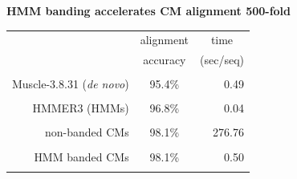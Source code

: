\documentclass[landscape]{slides}
\begin{document}
\begin{slide}
\begin{center}

\textbf{HMM banding accelerates CM alignment 500-fold}
\end{center}
\medskip
\medskip
\begin{center}

\begin{tabular}{rcr} 
& \multicolumn{1}{c}{alignment} & \multicolumn{1}{c}{time} \\
& \multicolumn{1}{c}{accuracy} & \multicolumn{1}{c}{(sec/seq)} \\ \hline
& \multicolumn{1}{c}{} & \multicolumn{1}{c}{} \\
Muscle-3.8.31 (\emph{de novo}) & 95.4\% & 0.49 \\
& \multicolumn{1}{c}{} & \multicolumn{1}{c}{} \\
HMMER3 (HMMs) & 96.8\% & 0.04 \\ 
& \multicolumn{1}{c}{} & \multicolumn{1}{c}{} \\
non-banded CMs & 98.1\% & 276.76 \\
& \multicolumn{1}{c}{} & \multicolumn{1}{c}{} \\
HMM banded CMs & 98.1\% & 0.50 \\ %
& \multicolumn{1}{c}{} & \multicolumn{1}{c}{} \\
\end{tabular}
\end{center}

\vfill
\scriptsize
{}
\end{slide}
\end{document}
